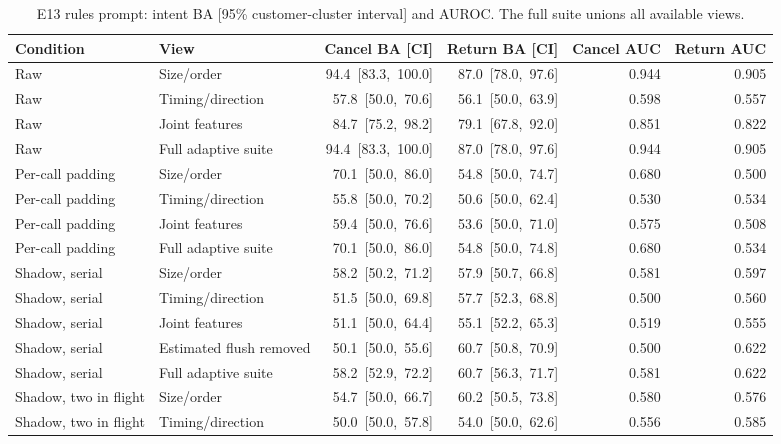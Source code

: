 \begin{table}[htbp]\centering\footnotesize
\caption{E13 rules prompt: intent BA [95\% customer-cluster interval] and AUROC. The full suite unions all available views.}
\begin{tabular}{llrrrr}\toprule
Condition & View & Cancel BA [CI] & Return BA [CI] & Cancel AUC & Return AUC\\\midrule
Raw & Size/order & \mbox{94.4 [83.3, 100.0]} & \mbox{87.0 [78.0, 97.6]} & 0.944 & 0.905 \\
Raw & Timing/direction & \mbox{57.8 [50.0, 70.6]} & \mbox{56.1 [50.0, 63.9]} & 0.598 & 0.557 \\
Raw & Joint features & \mbox{84.7 [75.2, 98.2]} & \mbox{79.1 [67.8, 92.0]} & 0.851 & 0.822 \\
Raw & Full adaptive suite & \mbox{94.4 [83.3, 100.0]} & \mbox{87.0 [78.0, 97.6]} & 0.944 & 0.905 \\
\addlinespace[2pt]
Per-call padding & Size/order & \mbox{70.1 [50.0, 86.0]} & \mbox{54.8 [50.0, 74.7]} & 0.680 & 0.500 \\
Per-call padding & Timing/direction & \mbox{55.8 [50.0, 70.2]} & \mbox{50.6 [50.0, 62.4]} & 0.530 & 0.534 \\
Per-call padding & Joint features & \mbox{59.4 [50.0, 76.6]} & \mbox{53.6 [50.0, 71.0]} & 0.575 & 0.508 \\
Per-call padding & Full adaptive suite & \mbox{70.1 [50.0, 86.0]} & \mbox{54.8 [50.0, 74.8]} & 0.680 & 0.534 \\
\addlinespace[2pt]
Shadow, serial & Size/order & \mbox{58.2 [50.2, 71.2]} & \mbox{57.9 [50.7, 66.8]} & 0.581 & 0.597 \\
Shadow, serial & Timing/direction & \mbox{51.5 [50.0, 69.8]} & \mbox{57.7 [52.3, 68.8]} & 0.500 & 0.560 \\
Shadow, serial & Joint features & \mbox{51.1 [50.0, 64.4]} & \mbox{55.1 [52.2, 65.3]} & 0.519 & 0.555 \\
Shadow, serial & Estimated flush removed & \mbox{50.1 [50.0, 55.6]} & \mbox{60.7 [50.8, 70.9]} & 0.500 & 0.622 \\
Shadow, serial & Full adaptive suite & \mbox{58.2 [52.9, 72.2]} & \mbox{60.7 [56.3, 71.7]} & 0.581 & 0.622 \\
\addlinespace[2pt]
Shadow, two in flight & Size/order & \mbox{54.7 [50.0, 66.7]} & \mbox{60.2 [50.5, 73.8]} & 0.580 & 0.576 \\
Shadow, two in flight & Timing/direction & \mbox{50.0 [50.0, 57.8]} & \mbox{54.0 [50.0, 62.6]} & 0.556 & 0.585 \\

\end{tabular}
\end{table}
